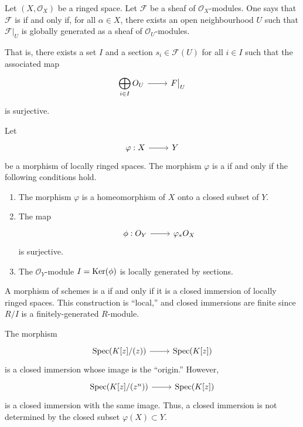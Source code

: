 \documentclass [11 pt, oneside] {article}
\begin{document}
\begin{definition}\label{}\text{}
Let $(X,\mathscr{O}_X)$ be a ringed space. Let $\mathscr{F}$ be a sheaf of $\mathscr{O}_X$-modules. One says that $\mathscr{F}$ is  if and only if, for all $\alpha\in X$, there exists an open neighbourhood $U$ such that $\mathscr{F}\big |_U$ is globally generated as a sheaf of $\mathscr{O}_U$-modules.
\end{definition}

\begin{remark}
	That is, there exists a set $I$ and a section $s_i\in \mathscr{F}(U)$ for all $i\in I$ such that the associated map
	\[
\begin{tikzcd}
\displaystyle\bigoplus_{i\in I}\mathscr{O}_U\ar[r]& \mathscr{F}\big|_U
\end{tikzcd}
\]
	is surjective.
\end{remark}

\begin{definition}\label{}\text{}
Let 
\[
\begin{tikzcd}
\varphi :X\ar[r]& Y
\end{tikzcd}
\] 
be a morphism of locally ringed spaces. The morphism $\varphi$ is a  if and only if the following conditions hold.
\begin{enumerate}
	\item The morphism $\varphi$ is a homeomorphism of $X$ onto a closed subset of $Y$.
	\item The map
	\[
\begin{tikzcd}
\phi :\mathscr{O}_Y \ar[r]& \varphi_* \mathscr{O}_X
\end{tikzcd}
\]
is surjective.
	\item The $\mathscr{O}_Y$-module $\relax{I} = \operatorname{Ker} (\phi)$ is locally generated by sections.
\end{enumerate}
\end{definition}

A morphism of schemes is a  if and only if it is a closed immersion of locally ringed spaces. This construction is ``local,'' and closed immersions are finite since $R/I$ is a finitely-generated $R$-module. 

\begin{example}[ ]\label{ci_1}\text{}
The morphism 
\[
\begin{tikzcd}
\Spec(K[z]/(z)) \ar[r]& \Spec(K[z])
\end{tikzcd}
\]
is a closed immersion whose image is the ``origin.'' However,
\[
\begin{tikzcd}
\Spec(K[z]/(z^n)) \ar[r]& \Spec(K[z])
\end{tikzcd}
\]
is a closed immersion with the same image. Thus, a closed immersion is not determined by the closed subset $\varphi (X)\subset Y$. 
\end{example}
\end{document}
